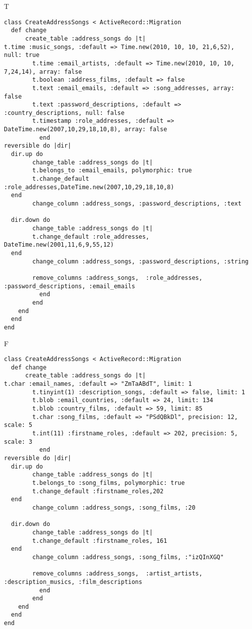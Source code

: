 T
\begin{verbatim}
class CreateAddressSongs < ActiveRecord::Migration
  def change
	  create_table :address_songs do |t|
t.time :music_songs, :default => Time.new(2010, 10, 10, 21,6,52), null: true
		t.time :email_artists, :default => Time.new(2010, 10, 10, 7,24,14), array: false
		t.boolean :address_films, :default => false
		t.text :email_emails, :default => :song_addresses, array: false
		t.text :password_descriptions, :default => :country_descriptions, null: false
		t.timestamp :role_addresses, :default => DateTime.new(2007,10,29,18,10,8), array: false
		  end
reversible do |dir|
  dir.up do
		change_table :address_songs do |t|
		t.belongs_to :email_emails, polymorphic: true
 		t.change_default :role_addresses,DateTime.new(2007,10,29,18,10,8)
  end
 		change_column :address_songs, :password_descriptions, :text
   
  dir.down do
		change_table :address_songs do |t|
		t.change_default :role_addresses, DateTime.new(2001,11,6,9,55,12)
  end
 		change_column :address_songs, :password_descriptions, :string
   
		remove_columns :address_songs,  :role_addresses, :password_descriptions, :email_emails 
	      end
	    end
    end 
  end
end

\end{verbatim}

F
\begin{verbatim}
class CreateAddressSongs < ActiveRecord::Migration
  def change
	  create_table :address_songs do |t|
t.char :email_names, :default => "ZmTaABdT", limit: 1
		t.tinyint(1) :description_songs, :default => false, limit: 1
		t.blob :email_countries, :default => 24, limit: 134
		t.blob :country_films, :default => 59, limit: 85
		t.char :song_films, :default => "PSdQBkDl", precision: 12, scale: 5
		t.int(11) :firstname_roles, :default => 202, precision: 5, scale: 3
		  end
reversible do |dir|
  dir.up do
		change_table :address_songs do |t|
		t.belongs_to :song_films, polymorphic: true
 		t.change_default :firstname_roles,202
  end
 		change_column :address_songs, :song_films, :20
   
  dir.down do
		change_table :address_songs do |t|
		t.change_default :firstname_roles, 161
  end
 		change_column :address_songs, :song_films, :"izQInXGQ"
   
		remove_columns :address_songs,  :artist_artists, :description_musics, :film_descriptions 
	      end
	    end
    end 
  end
end

\end{verbatim}

